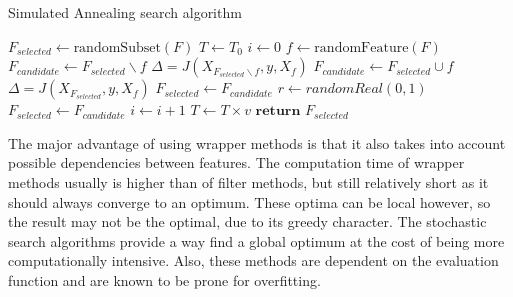 \documentclass[10pt,a4paper]{article}
\begin{document}
\begin{itemize}
		\begin{algorithm}[h]
			\caption{Simulated Annealing search algorithm\cite{Reunanen2006}}\label{alg:SASearch}
			\begin{algorithmic}[1]
				\State $F_{\textit{selected}} \gets \text{randomSubset}(F)$	
				\State $T \gets T_0$			
							
				\State $i \gets 0$				
								
				\State $f \gets \text{randomFeature}(F)$	
					
				\State $F_{\textit{candidate}} \gets  F_{\textit{selected}} \backslash f$ 
				\State $\Delta = J(X_{F_{\textit{selected}} \backslash f}, y, X_f)$ 
				\Else	{}
				\State $F_{\textit{candidate}} \gets  F_{\textit{selected}} \cup f$				
				\State $\Delta = J(X_{F_{\textit{selected}}} , y, X_f)$ 
				\EndIf
				 
				\State $F_{\textit{selected}} \gets F_{\textit{candidate}}$ 
				\Else
				\State $r \gets randomReal(0, 1)$ 
				  
				\State $F_{\textit{selected}} \gets F_{\textit{candidate}}$ 
				\EndIf
				\State $i \gets i + 1$ 
				\EndIf				
				\EndWhile
				\State $T \gets T \times v$  
				\EndWhile
				\State $\textbf{return } F_{\textit{selected}}$
				\EndProcedure
			\end{algorithmic}
		\end{algorithm}
		 
	\end{itemize}

	The major advantage of using wrapper methods is that it also takes into account possible dependencies between features. The computation time of wrapper methods usually is higher than of filter methods, but still relatively short as it should always converge to an optimum. These optima can be local however, so the result may not be the optimal, due to its greedy character. The stochastic search algorithms provide a way find a global optimum at the cost of being more computationally intensive. Also, these methods are dependent on the evaluation function and are known to be prone for overfitting\cite{Reunanen2006, saeys2007review}.
	
\end{document}
